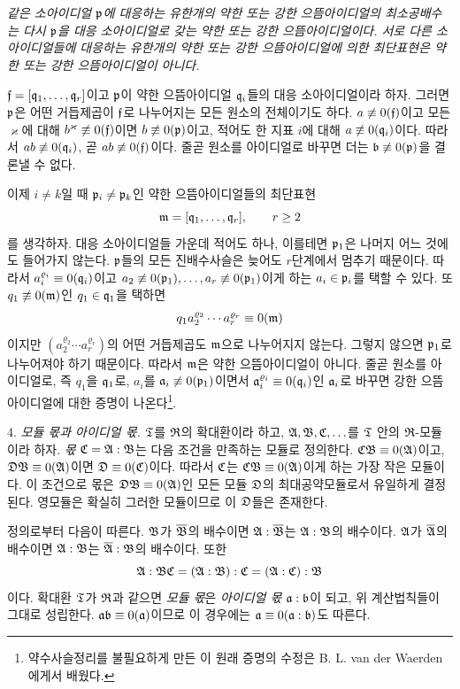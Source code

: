 \emph{같은 소아이디얼 \(\mathfrak{p}\)에 대응하는 유한개의 약한 또는 강한 으뜸아이디얼의 최소공배수는 다시 \(\mathfrak{p}\)을 대응 소아이디얼로 갖는 약한 또는 강한 으뜸아이디얼이다. 서로 다른 소아이디얼들에 대응하는 유한개의 약한 또는 강한 으뜸아이디얼에 의한 최단표현은 약한 또는 강한 으뜸아이디얼이 아니다.}

\(\mathfrak{f}=[\mathfrak{q}_1,\ldots,\mathfrak{q}_r]\)이고 \(\mathfrak{p}\)이 약한 으뜸아이디얼 \(\mathfrak{q}_i\)들의 대응 소아이디얼이라 하자. 그러면 \(\mathfrak{p}\)은 어떤 거듭제곱이 \(\mathfrak{f}\)로 나누어지는 모든 원소의 전체이기도 하다. \(a\not\equiv0(\mathfrak{f})\)이고 모든 \(\varkappa\)에 대해 \(b^\varkappa\not\equiv0(\mathfrak{f})\)이면 \(b\not\equiv0(\mathfrak{p})\)이고, 적어도 한 지표 \(i\)에 대해 \(a\not\equiv0(\mathfrak{q}_i)\)이다. 따라서 \(ab\not\equiv0(\mathfrak{q}_i)\), 곧 \(ab\not\equiv0(\mathfrak{f})\)이다. 줄곧 원소를 아이디얼로 바꾸면 더는 \(\mathfrak{b}\not\equiv0(\mathfrak{p})\)을 결론낼 수 없다.

이제 \(i\ne k\)일 때 \(\mathfrak{p}_i\ne\mathfrak{p}_k\)인 약한 으뜸아이디얼들의 최단표현
\[
        \mathfrak{m}=[\mathfrak{q}_1,\ldots,\mathfrak{q}_r],\qquad r\ge2
\]
를 생각하자. 대응 소아이디얼들 가운데 적어도 하나, 이를테면 \(\mathfrak{p}_1\)은 나머지 어느 것에도 들어가지 않는다. \(\mathfrak{p}\)들의 모든 진배수사슬은 늦어도 \(r\)단계에서 멈추기 때문이다. 따라서 \(a_i^{\varrho_i}\equiv0(\mathfrak{q}_i)\)이고 \(a_2\not\equiv0(\mathfrak{p}_1),\ldots,a_r\not\equiv0(\mathfrak{p}_1)\)이게 하는 \(a_i\in\mathfrak{p}_i\)를 택할 수 있다. 또 \(q_1\not\equiv0(\mathfrak{m})\)인 \(q_1\in\mathfrak{q}_1\)을 택하면
\[
q_1a_2^{\varrho_2}\cdots a_r^{\varrho_r}\equiv0(\mathfrak{m})
\]
이지만 \((a_2^{\varrho_2}\cdots a_r^{\varrho_r})\)의 어떤 거듭제곱도 \(\mathfrak{m}\)으로 나누어지지 않는다. 그렇지 않으면 \(\mathfrak{p}_1\)로 나누어져야 하기 때문이다. 따라서 \(\mathfrak{m}\)은 약한 으뜸아이디얼이 아니다. 줄곧 원소를 아이디얼로, 즉 \(q_1\)을 \(\mathfrak{q}_1\)로, \(a_i\)를 \(\mathfrak{a}_i\not\equiv0(\mathfrak{p}_1)\)이면서 \(\mathfrak{a}_i^{\varrho_i}\equiv0(\mathfrak{q}_i)\)인 \(\mathfrak{a}_i\)로 바꾸면 강한 으뜸아이디얼에 대한 증명이 나온다\footnote{약수사슬정리를 불필요하게 만든 이 원래 증명의 수정은 B. L. van der Waerden에게서 배웠다.}.

4. \emph{모듈 몫과 아이디얼 몫.} \(\mathfrak{T}\)를 \(\mathfrak{R}\)의 확대환이라 하고, \(\mathfrak A,\mathfrak B,\mathfrak{C},\ldots\)를 \(\mathfrak{T}\) 안의 \(\mathfrak{R}\)-모듈이라 하자. \emph{몫} \(\mathfrak{C}=\mathfrak A:\mathfrak B\)는 다음 조건을 만족하는 모듈로 정의한다. \(\mathfrak{C}\mathfrak B\equiv0(\mathfrak A)\)이고, \(\mathfrak D\mathfrak B\equiv0(\mathfrak A)\)이면 \(\mathfrak D\equiv0(\mathfrak{C})\)이다. 따라서 \(\mathfrak{C}\)는 \(\mathfrak{C}\mathfrak B\equiv0(\mathfrak A)\)이게 하는 \glqq{}가장 작은\grqq{} 모듈이다. 이 조건으로 몫은 \(\mathfrak D\mathfrak B\equiv0(\mathfrak A)\)인 모든 모듈 \(\mathfrak D\)의 최대공약모듈로서 유일하게 결정된다. 영모듈은 확실히 그러한 모듈이므로 이 \(\mathfrak D\)들은 존재한다.

정의로부터 다음이 따른다. \(\mathfrak B\)가 \(\overline{\mathfrak B}\)의 배수이면 \(\mathfrak A:\overline{\mathfrak B}\)는 \(\mathfrak A:\mathfrak B\)의 배수이다. \(\mathfrak A\)가 \(\overline{\mathfrak A}\)의 배수이면 \(\mathfrak A:\mathfrak B\)는 \(\overline{\mathfrak A}:\mathfrak B\)의 배수이다. 또한
\[
        \mathfrak A:\mathfrak B\mathfrak{C}=(\mathfrak A:\mathfrak B):\mathfrak{C}=(\mathfrak A:\mathfrak{C}):\mathfrak B
\]
이다. 확대환 \(\mathfrak{T}\)가 \(\mathfrak{R}\)과 같으면 \emph{모듈 몫}은 \emph{아이디얼 몫} \(\mathfrak{a}:\mathfrak{b}\)이 되고, 위 계산법칙들이 그대로 성립한다. \(\mathfrak{a}\mathfrak{b}\equiv0(\mathfrak{a})\)이므로 이 경우에는 \(\mathfrak{a}\equiv0(\mathfrak{a}:\mathfrak{b})\)도 따른다.

